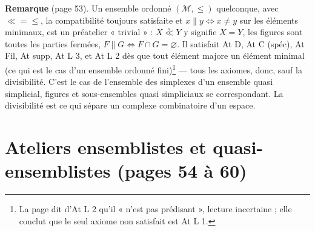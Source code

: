 \documentclass[11pt,a4paper]{article}
\begin{document}
\textbf{Remarque} (page 53). Un ensemble ordonné $(\mathcal{M}, \leq)$
quelconque, avec $\ll = \leq$, la compatibilité toujours satisfaite et $x
\parallel y \iff x \neq y$ sur les éléments minimaux, est un préatelier
« trivial » : $X \mathrel{\overset{\circ}{\ll}} Y$ y signifie $X = Y$, les figures
sont toutes les parties fermées, $F \parallel G \iff F \cap G = \varnothing$. Il
satisfait At D, At C (spéc), At Fil, At supp, At L 3, et At L 2 dès que tout
élément majore un élément minimal (ce qui est le cas d'un ensemble ordonné fini)\footnote{La
page dit d'At L 2 qu'il « n'est pas prédisant », lecture incertaine ; elle conclut
que le seul axiome non satisfait est At L 1.} --- tous les axiomes, donc, sauf la
divisibilité. C'est le cas de l'ensemble des simplexes d'un ensemble quasi
simplicial, figures et sous-ensembles quasi simpliciaux se correspondant. La
divisibilité est ce qui sépare un complexe combinatoire d'un espace.

\section*{Ateliers ensemblistes et quasi-ensemblistes (pages 54 à 60)}
\end{document}
